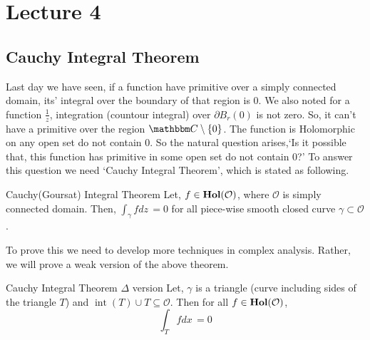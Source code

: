 \documentclass[../ComplexAnalysis_Notes.tex]{subfiles}
\begin{document}
\chapter*{Lecture 4} %

\setcounter{chapter}{4} %
\setcounter{section}{0}
\setcounter{equation}{0}
\setcounter{figure}{0}

 \section{Cauchy Integral Theorem}

 Last day we have seen, if a function have primitive over a simply connected domain, its' integral over the boundary of that region is 0. We also noted for a function $\frac{1}{z}$, integration (countour integral) over $\partial B_{r}(0)$ is not zero.  So, it can't have a primitive over the region $\C \setminus \qty{0}$. The function is Holomorphic on any open set do not contain $0$. So the natural question arises,`Is it possible that, this function has primitive in some open set do not contain $0$?' To answer this question we need `Cauchy Integral Theorem', which is stated as following. 

 \begin{Thm}{Cauchy(Goursat) Integral Theorem}{}
    \hspace*{0.1cm} Let, $f \in  \operatorname{\mathbf{Hol}}(\mathcal{O})$, where $\mathcal{O}$ is simply connected domain. Then, $\int_{\gamma} f dz\, =0$ for all piece-wise smooth closed curve $\gamma \subset \mathcal{O}$. 
 \end{Thm}

\noindent To prove this we need to develop more techniques in complex analysis. Rather, we will prove a weak version of the above theorem. 

\begin{Thm}{Cauchy Integral Theorem $\Delta$ version}{} \label{thm:4.1}
    \hspace*{0.1cm} Let, $\gamma$ is a triangle (curve including sides of the triangle $T$) and $\operatorname{int}(T) \cup T \subseteq \mathcal{O}$. Then for all $f \in \operatorname{\mathbf{Hol}}(\mathcal{O})$, \[
        \int_{T} f dx\, = 0
    \]     
\end{Thm}
\end{document}

